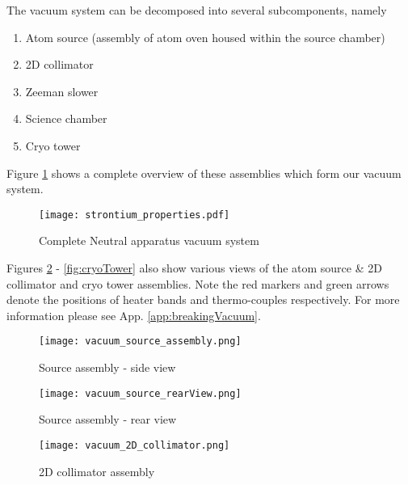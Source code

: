 \noindent The vacuum system can be decomposed into several subcomponents, namely
\begin{enumerate}
\item Atom source (assembly of atom oven housed within the source chamber)
\item 2D collimator
\item Zeeman slower
\item Science chamber
\item Cryo tower
\end{enumerate}
Figure \ref{fig:vacuumSystem} shows a complete overview of these assemblies which form our vacuum system.
	\begin{figure} 
		\centerline{
		\texttt{[image: strontium\_properties.pdf]}}
		\caption{Complete Neutral apparatus vacuum system}
		\label{fig:vacuumSystem}
	\end{figure}
Figures \ref{fig:sourceSideView} - \ref{fig:cryoTower} also show various views of the atom source \& 2D collimator and cryo tower assemblies. Note the red markers and green arrows denote the positions of heater bands and thermo-couples respectively. For more information please see App. \ref{app:breakingVacuum}.
	\begin{figure} 
		\centerline{
		\texttt{[image: vacuum\_source\_assembly.png]}}
		\caption{Source assembly - side view}
		\label{fig:sourceSideView}
	\end{figure}
	
	\begin{figure} 
		\centerline{
		\texttt{[image: vacuum\_source\_rearView.png]}}
		\caption{Source assembly - rear view}
		\label{fig:sourceRearView}
	\end{figure}
	
	\begin{figure} 
		\centerline{
		\texttt{[image: vacuum\_2D\_collimator.png]}}
		\caption{2D collimator assembly}
		\label{fig:assembly_2Dcoll}
	\end{figure}
	
